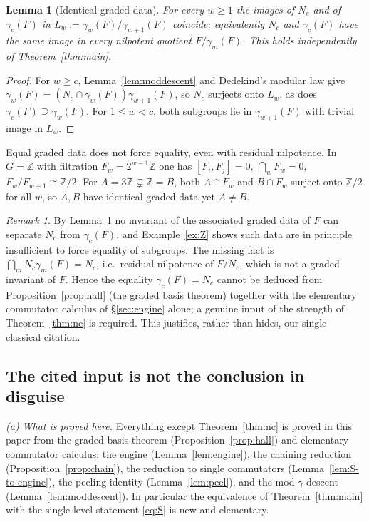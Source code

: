 \documentclass{amsart}
\newtheorem{lemma}{Lemma}
\theoremstyle{definition}
\theoremstyle{remark}
\newtheorem{remark}{Remark}
\begin{document}
\begin{lemma}[Identical graded data]\label{lem:gradedNc}
For every $w\ge1$ the images of $N_c$ and of $\gamma_c(F)$ in
$L_w:=\gamma_w(F)/\gamma_{w+1}(F)$ coincide; equivalently $N_c$ and $\gamma_c(F)$
have the same image in every nilpotent quotient $F/\gamma_m(F)$. This holds
independently of Theorem~\ref{thm:main}.
\end{lemma}
\begin{proof}
For $w\ge c$, Lemma~\ref{lem:moddescent} and Dedekind's modular law give
$\gamma_w(F)=(N_c\cap\gamma_w(F))\gamma_{w+1}(F)$, so $N_c$ surjects onto $L_w$, as
does $\gamma_c(F)\supseteq\gamma_w(F)$. For $1\le w<c$, both subgroups lie in
$\gamma_{w+1}(F)$ with trivial image in $L_w$.
\end{proof}

\begin{example}\label{ex:Z}
Equal graded data does not force equality, even with residual nilpotence. In
$G=\mathbb Z$ with filtration $F_w=2^{w-1}\mathbb Z$ one has $[F_i,F_j]=0$,
$\bigcap_w F_w=0$, $F_w/F_{w+1}\cong\mathbb Z/2$. For $A=3\mathbb Z\subsetneq\mathbb
Z=B$, both $A\cap F_w$ and $B\cap F_w$ surject onto $\mathbb Z/2$ for all $w$, so
$A,B$ have identical graded data yet $A\ne B$.
\end{example}

\begin{remark}\label{rem:graded-insufficient}
By Lemma~\ref{lem:gradedNc} no invariant of the associated graded data of $F$ can
separate $N_c$ from $\gamma_c(F)$, and Example~\ref{ex:Z} shows such data are in
principle insufficient to force equality of subgroups. The missing fact is
$\bigcap_m N_c\gamma_m(F)=N_c$, i.e.\ residual nilpotence of $F/N_c$, which is not a
graded invariant of $F$. Hence the equality $\gamma_c(F)=N_c$ cannot be deduced from
Proposition~\ref{prop:hall} (the graded basis theorem) together with the elementary
commutator calculus of \S\ref{sec:engine} alone; a genuine input of the strength of
Theorem~\ref{thm:nc} is required. This justifies, rather than hides, our single
classical citation.
\end{remark}

\subsection{The cited input is not the conclusion in disguise}

\emph{(a) What is proved here.} Everything except Theorem~\ref{thm:nc} is proved in
this paper from the graded basis theorem (Proposition~\ref{prop:hall}) and
elementary commutator calculus: the engine (Lemma~\ref{lem:engine}), the chaining
reduction (Proposition~\ref{prop:chain}), the reduction to single commutators
(Lemma~\ref{lem:S-to-engine}), the peeling identity (Lemma~\ref{lem:peel}), and the
mod-$\gamma$ descent (Lemma~\ref{lem:moddescent}). In particular the equivalence of
Theorem~\ref{thm:main} with the single-level statement \eqref{eq:S} is new and
elementary.
\end{document}

